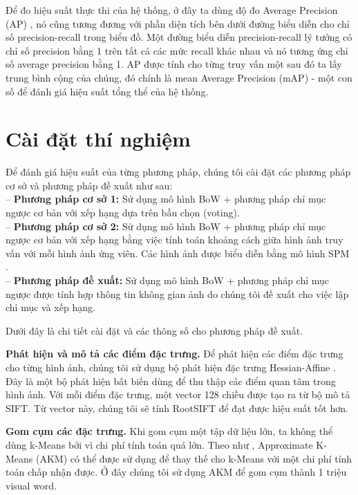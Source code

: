 Để đo hiệu suất thực thi của hệ thống, ở đây ta dùng độ đo Average Precision (AP) \cite{philbin2007object}, nó cũng tương đương với phần diện tích bên dưới đường biểu diễn cho chỉ số precision-recall trong biểu đồ. Một đường biểu diễn precision-recall lý tưởng có chỉ số precision bằng 1 trên tất cả các mức recall khác nhau và nó tương ứng chỉ số average precision bằng 1. AP được tính cho từng truy vấn một sau đó ta lấy trung bình cộng của chúng, đó chính là mean Average Precision (mAP) - một con số để đánh giá hiệu suất tổng thể của hệ thống.

\section{Cài đặt thí nghiệm}
\label{experimental-setting}
Để đánh giá hiệu suất của từng phương pháp, chúng tôi cài đặt các phương pháp cơ sở và phương pháp đề xuất như sau:\\
-- \textbf{Phương pháp cơ sở 1:} Sử dụng mô hình BoW + phương pháp chỉ mục ngược cơ bản với xếp hạng dựa trên bầu chọn (voting).\\
-- \textbf{Phương pháp cơ sở 2:} Sử dụng mô hình BoW + phương pháp chỉ mục ngược cơ bản với xếp hạng bằng việc tính toán khoảng cách giữa hình ảnh truy vấn với mỗi hình ảnh ứng viên. Các hình ảnh được biểu diễn bằng mô hình SPM \cite{lazebnik2006beyond}.\\
-- \textbf{Phương pháp đề xuất:} Sử dụng mô hình BoW + phương pháp chỉ mục ngược được tính hợp thông tin không gian ảnh do chúng tôi đề xuất cho việc lập chỉ mục và xếp hạng.

Dưới đây là chi tiết cài đặt và các thông số cho phương pháp đề xuất.

\textbf{Phát hiện và mô tả các điểm đặc trưng.} Để phát hiện các điểm đặc trưng cho từng hình ảnh, chúng tôi sử dụng bộ phát hiện đặc trưng Hessian-Affine \cite{mikolajczyk2005comparison}. Đây là một bộ phát hiện bất biến dùng để thu thập các điểm quan tâm trong hình ảnh. Với mỗi điểm đặc trưng, một vector 128 chiều được tạo ra từ bộ mô tả SIFT. Từ vector này, chúng tôi sẽ tính RootSIFT \cite{arandjelovic2012three} để đạt được hiệu suất tốt hơn.

\textbf{Gom cụm các đặc trưng.} Khi gom cụm một tập dữ liệu lớn, ta không thể dùng k-Means bởi vì chi phí tính toán quá lớn. Theo như \cite{philbin2007object}, Approximate K-Means (AKM) có thể được sử dụng để thay thế cho k-Means với một chi phí tính toán chấp nhận được. Ở đây chúng tôi sử dụng AKM để gom cụm thành 1 triệu visual word.

